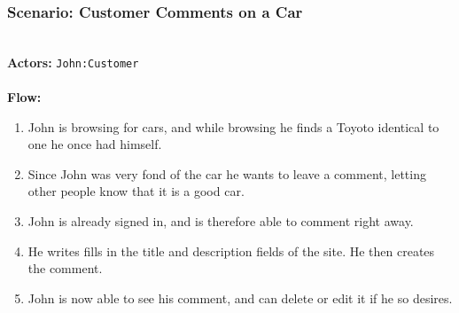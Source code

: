 \subsubsection{Scenario: Customer Comments on a Car}
\HRule \\[0.4cm]
\textbf{Actors:} \texttt{John:Customer}\\
\HRule \\[0.4cm]
\textbf{Flow:} \\
\begin{enumerate}
\item John is browsing for cars, and while browsing he finds a Toyoto identical to one he once had himself.
\item Since John was very fond of the car he wants to leave a comment, letting other people know that it is a good car.
\item John is already signed in, and is therefore able to comment right away.
\item He writes fills in the title and description fields of the site. He then creates the comment.
\item John is now able to see his comment, and can delete or edit it if he so desires.
\end{enumerate}
\HRule \\[0.4cm]
